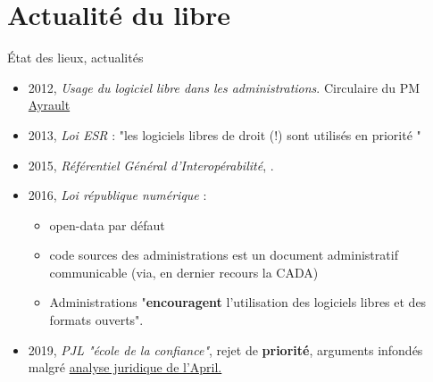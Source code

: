 \documentclass{beamer}
\begin{document}
\begin{frame}[plain]%
%  
\end{frame}



\section{Actualité du libre}

\begin{frame}{État des lieux, actualités}

  \begin{itemize}
  \item 2012, \textit{Usage du logiciel libre dans les
      administrations}. Circulaire du PM
    \href{http://circulaire.legifrance.gouv.fr/pdf/2012/09/cir_35837.pdf}{{\color{blue}Ayrault}}
  \item 2013, \textit{Loi ESR} : "les logiciels libres de droit (!)
    sont utilisés en priorité "
  \item 2015, \textit{Référentiel Général d'Interopérabilité},
    \href{http://references.modernisation.gouv.fr/sites/default/files/Referentiel_General_Interoperabilite_V2.pdf}{\color{blue}{RGIv2}}.
  \item 2016, \textit{Loi république numérique} :
    \begin{itemize}
    \item open-data par défaut
    \item code sources des administrations est un document
      administratif communicable (via, en dernier recours la CADA)
    \item Administrations "\textbf{encouragent} l'utilisation des
      logiciels libres et des formats ouverts".
    \end{itemize}
  \item 2019, \textit{PJL "école de la confiance"}, rejet de
    \textbf{priorité}, arguments infondés malgré
    \href{https://www.april.org/sites/default/files/20130612-note-legalite-disposition-legislative.pdf}{{\color{blue}analyse
        juridique de l'April.}}

  \end{itemize}

  
\end{frame}
\end{document}
